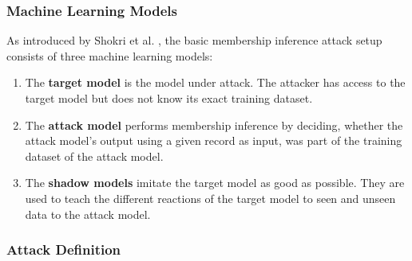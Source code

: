 \documentclass[runningheads]{llncs}
\begin{document}
\subsubsection{Machine Learning Models}

As introduced by Shokri et al. \cite{shokri2017membership}, the basic membership inference attack setup consists of three machine learning models:
\begin{enumerate}
    \item The \textbf{target model} is the model under attack. The attacker has access to the target model but does not know its exact training dataset.
    \item The \textbf{attack model} performs membership inference by deciding, whether the attack model's output using a given record as input, was part of the training dataset of the attack model.
    \item The \textbf{shadow models} imitate the target model as good as possible. They are used to teach the different reactions of the target model to seen and unseen data to the attack model.
\end{enumerate}

\subsubsection{Attack Definition}
\end{document}
